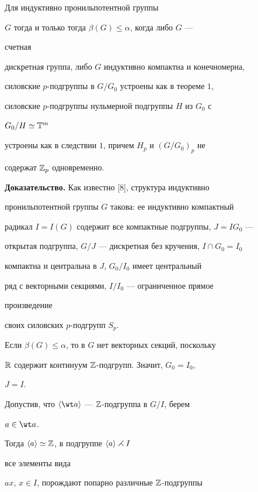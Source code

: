  


\begin{thm} 


Для индуктивно пронильпотентной группы  


$G$ тогда и только тогда $\beta(G)\le\alpha$, когда либо $G$ --- 


счетная 


дискретная группа, либо $G$ индуктивно компактна и конечномерна, 


силовские $p$-подгруппы в $G/G_0$ устроены как в теореме $1$, 


силовские $p$-подгруппы нульмерной подгруппы $H$ из $G_0$ с 


$G_0/H\simeq\Bbb T^m$ 


устроены как в следствии $1$, причем $H_p$ и $(G/G_0)_p$ не 


содержат $\Bbb Z_p$ одновременно. 


\end{thm} 


 


{\bf Доказательство.} Как известно [8], структура индуктивно 


пронильпотентной группы $G$ такова: ее индуктивно компактный 


радикал $I=I(G)$ содержит все компактные подгруппы, $J=IG_0$ --- 


открытая подгруппа, $G/J$ --- дискретная без кручения, $I\cap G_0=I_0$ 


компактна и центральна в $J$, $G_0/I_0$ имеет центральный  


ряд с векторными секциями, $I/I_0$ --- ограниченное прямое 


произведение 


своих силовских $p$-подгрупп $S_p$. 


 


Если $\beta(G)\le\alpha$, то в $G$ нет векторных секций, поскольку  


$\Bbb R$ содержит континуум $\Bbb Z$-подгрупп. Значит, $G_0=I_0$, 


$J=I$. 


Допустив, что $\la\wt a\ra$ --- $\Bbb Z$-подгруппа в $G/I$, берем 


$a\in\wt a$. 


Тогда $\langle a\rangle\simeq\Bbb Z$, в подгруппе $\langle a\rangle\rightthreetimes I$ 


все элементы вида  


$ax$, $x\in I$, порождают попарно различные $\Bbb Z$-подгруппы  


